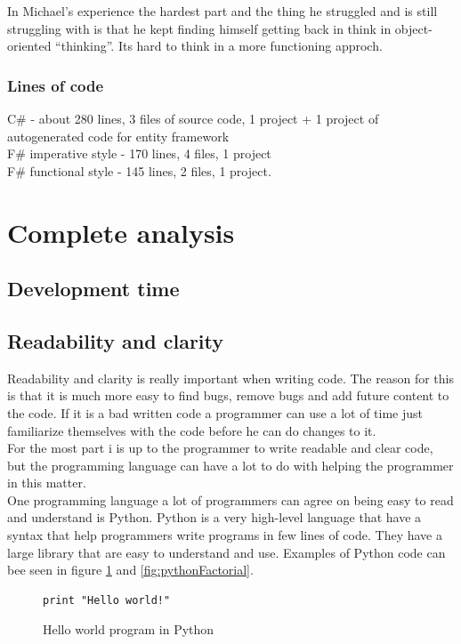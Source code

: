 \documentclass[12pt, a4paper]{article}
\begin{document}
In Michael’s experience the hardest part and the thing he struggled and is still struggling with is that he kept finding himself getting back in think in object-oriented “thinking”. Its hard to think in a more functioning approch.
\subsubsection{Lines of code}
C\# - about 280 lines, 3 files of source code, 1 project + 1 project of autogenerated code for entity framework\\
F\# imperative style - 170 lines, 4 files, 1 project\\

F\# functional style - 145 lines, 2 files, 1 project.
\newpage

\section{Complete analysis}
\subsection{Development time}

\newpage
\subsection{Readability and clarity}
Readability and clarity is really important when writing code. The reason for this is that it is much more easy to find bugs, remove bugs and add future content to the code. If it is a bad written code a programmer can use a lot of time just familiarize themselves with the code before he can do changes to it.\\

For the most part i is up to the programmer to write readable and clear code, but the programming language can have a lot to do with helping the programmer in this matter.\\

One programming language a lot of programmers can agree on being easy to read and understand is Python. Python is a very high-level language that have a syntax that help programmers write programs in few lines of code. They have a large library that are easy to understand and use. Examples of Python code can bee seen in figure \ref{fig:pythonHelloWorld} and \ref{fig:pythonFactorial}.\\

\begin{figure}[!h]
	\begin{lstlisting}
print "Hello world!"
	\end{lstlisting}
	\caption{Hello world program in Python}
	\label{fig:pythonHelloWorld}
\end{figure}
\end{document}

